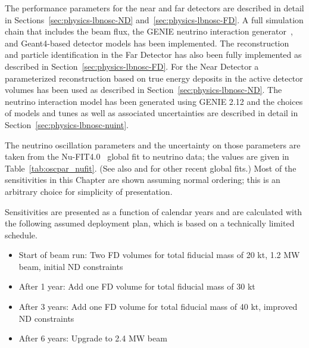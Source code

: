 The performance parameters for the near and far detectors are described in detail in Sections~\ref{sec:physics-lbnosc-ND} and~\ref{sec:physics-lbnosc-FD}. A full simulation chain that includes the beam flux, the GENIE neutrino interaction
generator~\cite{Andreopoulos:2009rq}, and Geant4-based detector models has been implemented. 
The reconstruction and particle identification in the Far Detector has also been fully implemented as described in Section~\ref{sec:physics-lbnosc-FD}. For the Near Detector a parameterized reconstruction based on true energy deposits in the active detector volumes has been used as described in Section~\ref{sec:physics-lbnosc-ND}. The neutrino interaction model has been generated using GENIE 2.12 and the choices of models and tunes as well as associated uncertainties are described in detail in Section~\ref{sec:physics-lbnosc-nuint}.

The neutrino oscillation parameters and the uncertainty on those parameters are taken from the Nu-FIT4.0~\cite{Esteban:2018azc,nufitweb} global fit to neutrino data; the
values are given in Table~\ref{tab:oscpar_nufit}.  (See also
\cite{deSalas:2017kay} and \cite{Capozzi:2017yic} for other recent global fits.) Most of the sensitivities in this Chapter are shown assuming normal ordering; this is an arbitrary choice for simplicity of presentation.

Sensitivities are presented as a function of calendar years and are calculated with the following assumed deployment plan, which is based on a technically limited schedule.
\begin{itemize}
    \item Start of beam run: Two FD volumes for total fiducial mass of 20 kt, 1.2 MW beam, initial ND constraints
    \item After 1 year: Add one FD volume for total fiducial mass of 30 kt
    \item After 3 years: Add one FD volume for total fiducial mass of 40 kt, improved ND constraints
    \item After 6 years: Upgrade to 2.4 MW beam
\end{itemize}

